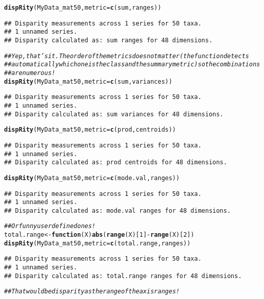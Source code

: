 \documentclass{article}\usepackage[]{graphicx}\usepackage[]{color}
\makeatletter
\newcommand{\hlnum}[1]{\textcolor[rgb]{0.686,0.059,0.569}{#1}}%
\newcommand{\hlcom}[1]{\textcolor[rgb]{0.678,0.584,0.686}{\textit{#1}}}%
\newcommand{\hlopt}[1]{\textcolor[rgb]{0,0,0}{#1}}%
\newcommand{\hlstd}[1]{\textcolor[rgb]{0.345,0.345,0.345}{#1}}%
\newcommand{\hlkwa}[1]{\textcolor[rgb]{0.161,0.373,0.58}{\textbf{#1}}}%
\newcommand{\hlkwb}[1]{\textcolor[rgb]{0.69,0.353,0.396}{#1}}%
\newcommand{\hlkwc}[1]{\textcolor[rgb]{0.333,0.667,0.333}{#1}}%
\newcommand{\hlkwd}[1]{\textcolor[rgb]{0.737,0.353,0.396}{\textbf{#1}}}%
\newenvironment{kframe}{%
 \def\at@end@of@kframe{}%
 \ifinner\ifhmode%
  \def\at@end@of@kframe{\end{minipage}}%
  \begin{minipage}{\columnwidth}%
 \fi\fi%
 \def\FrameCommand##1{\hskip\@totalleftmargin \hskip-\fboxsep
 \colorbox{shadecolor}{##1}\hskip-\fboxsep
     \hskip-\linewidth \hskip-\@totalleftmargin \hskip\columnwidth}%
 \MakeFramed {\advance\hsize-\width
   \@totalleftmargin\z@ \linewidth\hsize
   \@setminipage}}%
 {\par\unskip\endMakeFramed%
 \at@end@of@kframe}
\newenvironment{knitrout}{}{} %
\makeatother
\begin{document}
\begin{knitrout}
\color{fgcolor}\begin{kframe}
\begin{alltt}
\hlkwd{dispRity}\hlstd{(MyData_mat50,} \hlkwc{metric} \hlstd{=} \hlkwd{c}\hlstd{(sum, ranges))}
\end{alltt}
\begin{verbatim}
## Disparity measurements across 1 series for 50 taxa. 
## 1 unnamed series.
## Disparity calculated as: sum ranges for 48 dimensions.
\end{verbatim}
\begin{alltt}
\hlcom{## Yep, that's it. The order of the metrics does not matter (the function detects}
\hlcom{## automatically which one is the class and the summary metric) so the combinations}
\hlcom{## are numerous!}
\hlkwd{dispRity}\hlstd{(MyData_mat50,} \hlkwc{metric} \hlstd{=} \hlkwd{c}\hlstd{(sum, variances))}
\end{alltt}
\begin{verbatim}
## Disparity measurements across 1 series for 50 taxa. 
## 1 unnamed series.
## Disparity calculated as: sum variances for 48 dimensions.
\end{verbatim}
\begin{alltt}
\hlkwd{dispRity}\hlstd{(MyData_mat50,} \hlkwc{metric} \hlstd{=} \hlkwd{c}\hlstd{(prod, centroids))}
\end{alltt}
\begin{verbatim}
## Disparity measurements across 1 series for 50 taxa. 
## 1 unnamed series.
## Disparity calculated as: prod centroids for 48 dimensions.
\end{verbatim}
\begin{alltt}
\hlkwd{dispRity}\hlstd{(MyData_mat50,} \hlkwc{metric} \hlstd{=} \hlkwd{c}\hlstd{(mode.val, ranges))}
\end{alltt}
\begin{verbatim}
## Disparity measurements across 1 series for 50 taxa. 
## 1 unnamed series.
## Disparity calculated as: mode.val ranges for 48 dimensions.
\end{verbatim}
\begin{alltt}
\hlcom{## Or funny user defined ones!}
\hlstd{total.range} \hlkwb{<-} \hlkwa{function}\hlstd{(}\hlkwc{X}\hlstd{)} \hlkwd{abs}\hlstd{(}\hlkwd{range}\hlstd{(X)[}\hlnum{1}\hlstd{]}\hlopt{-}\hlkwd{range}\hlstd{(X)[}\hlnum{2}\hlstd{])}
\hlkwd{dispRity}\hlstd{(MyData_mat50,} \hlkwc{metric} \hlstd{=} \hlkwd{c}\hlstd{(total.range, ranges))}
\end{alltt}
\begin{verbatim}
## Disparity measurements across 1 series for 50 taxa. 
## 1 unnamed series.
## Disparity calculated as: total.range ranges for 48 dimensions.
\end{verbatim}
\begin{alltt}
\hlcom{## That would be disparity as the range of the axis ranges!}
\end{alltt}
\end{kframe}
\end{knitrout}
\end{document}
